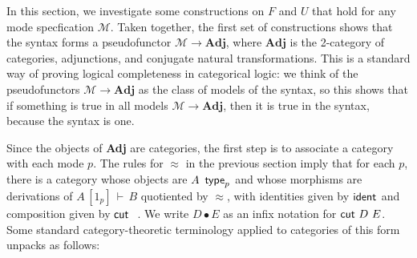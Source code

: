 \documentclass{drl-common/llncs}
\newcommand{\M}{\ensuremath{\mathcal{M}}}
\newcommand{\Adj}{\textbf{Adj}}
\renewcommand\wftp[2]{\ensuremath{#1 \,\,\, \dsd{type}_{#2}}}
\newcommand\seq[3]{\ensuremath{#1 \, [ #2 ] \, \vdash \, #3}}
\newcommand\ident[1]{\ensuremath{\dsd{ident}_{#1}}}
\newcommand\cut[2]{\ensuremath{{\dsd{cut} \,\, #1 \,\, #2}}}
\newcommand\cuti{\ensuremath{\bullet}}
\newcommand\ap[2]{\ensuremath{#1 \approx #2}}
\begin{document}
In this section, we investigate some constructions on $F$ and $U$ that
hold for any mode specfication $\M$.  Taken together, the first set of
constructions shows that the syntax forms a pseudofunctor $\M \to \Adj$,
where $\Adj$ is the 2-category of categories, adjunctions, and conjugate
natural transformations.  This is a standard way of proving logical
completeness in categorical logic: we think of the pseudofunctors $\M
\to \Adj$ as the class of models of the syntax, so this shows that if
something is true in all models $\M \to \Adj$, then it is true in the
syntax, because the syntax is one.  

Since the objects of \Adj\/ are categories,
the first step is to associate a category with each mode $p$.  The rules
for $\ap{}{}$ in the previous section imply that for each $p$, there is
a category whose objects are \wftp{A}{p} and whose morphisms are
derivations of \seq{A}{1_p}{B} quotiented by $\ap{}{}$, with identities
given by \ident{} and composition given by \cut{}{}.  We write $D \cuti
E$ as an infix notation for \cut{D}{E}.  Some standard
category-theoretic terminology applied to categories of this form
unpacks as follows:
\end{document}
